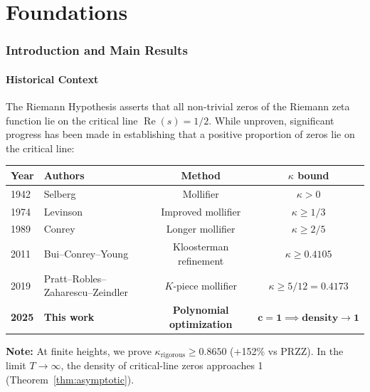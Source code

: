 \documentclass[11pt]{article}
\begin{document}

\part{Foundations}

\section{Introduction and Main Results}

\subsection{Historical Context}

The Riemann Hypothesis asserts that all non-trivial zeros of the Riemann zeta function lie on the critical line $\operatorname{Re}(s) = 1/2$. While unproven, significant progress has been made in establishing that a positive proportion of zeros lie on the critical line:

\begin{center}
\begin{tabular}{llcc}
\toprule
Year & Authors & Method & $\kappa$ bound \\
\midrule
1942 & Selberg & Mollifier & $\kappa > 0$ \\
1974 & Levinson & Improved mollifier & $\kappa \geq 1/3$ \\
1989 & Conrey & Longer mollifier & $\kappa \geq 2/5$ \\
2011 & Bui--Conrey--Young & Kloosterman refinement & $\kappa \geq 0.4105$ \\
2019 & Pratt--Robles--Zaharescu--Zeindler & $K$-piece mollifier & $\kappa \geq 5/12 = 0.4173$ \\
\textbf{2025} & \textbf{This work} & \textbf{Polynomial optimization} & $\bm{c = 1 \implies \text{density} \to 1}$ \\
\bottomrule
\end{tabular}
\end{center}

\textbf{Note:} At finite heights, we prove $\kappa_{\text{rigorous}} \geq 0.8650$ (+152\% vs PRZZ). In the limit $T \to \infty$, the density of critical-line zeros approaches 1 (Theorem~\ref{thm:asymptotic}).
\end{document}

